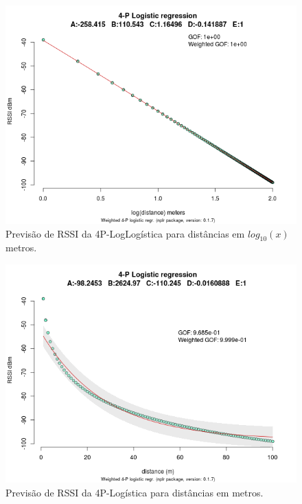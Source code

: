 \documentclass[
	12pt,				%
	twoside,			%
	a4paper,			%
	english,			%
	french,				%
	spanish,			%
	brazil				%
	]{abntex2}
\begin{document}
\begin{figure}[!htb]
    \caption{\label{logistic_regression_1} Previsão de RSSI da 4P-LogLogística para distâncias em $ log_{10}(x) $ metros.}
    \begin{center}
        \includegraphics[scale=0.6]{imagens/logistic-regression-1.png}
    \end{center}
\end{figure}
\begin{figure}[!htb]
    \caption{\label{logistic_regression_2} Previsão de RSSI da 4P-Logística para distâncias em metros.}
    \begin{center}
        \includegraphics[scale=0.6]{imagens/logistic-regression-2.png}
    \end{center}
\end{figure}
\end{document}
